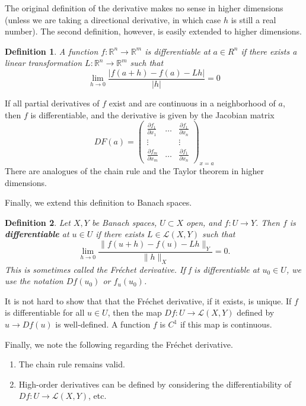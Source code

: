 \documentclass[12pt]{amsart}         %
\newtheorem{definition}{Definition}[section]
\theoremstyle{remark}
\newcommand{\R}{\mathbb{R}}
\begin{document}
The original definition of the derivative makes no sense in higher dimensions (unless we are taking a directional derivative, in which case $h$ is still a real number). The second definition, however, is easily extended to higher dimensions.

\begin{definition}
A function $f:\R^n \rightarrow \R^m$ is \emph{differentiable} at $a \in R^n$ if there exists a linear transformation $L: \R^n \rightarrow \R^m$ such that
\[
\lim_{h \rightarrow 0}\frac{|f(a + h) - f(a) - L h |}{|h|} = 0
\]
\end{definition}

If all partial derivatives of $f$ exist and are continuous in a neighborhood of $a$, then $f$ is differentiable, and the derivative is given by the Jacobian matrix
\[
DF(a) = \begin{pmatrix}
\frac{\partial f_1}{\partial x_1} & \dots & \frac{\partial f_1}{\partial x_n} \\
\vdots && \vdots \\
\frac{\partial f_m}{\partial x_m} & \dots & \frac{\partial f_1}{\partial x_n} 
\end{pmatrix}_{x = a}
\]
There are analogues of the chain rule and the Taylor theorem in higher dimensions. 

Finally, we extend this definition to Banach spaces.

\begin{definition}
Let $X, Y$ be Banach spaces, $U \subset X$ open, and $f \colon U \rightarrow Y$. Then $f$ is \textbf{differentiable} at $u \in U$ if there exists $L \in \mathcal{L}(X, Y)$ such that
\[
\lim_{h \rightarrow 0} \frac{ \|f(u + h) - f(u) - Lh \|_Y}{\|h\|_X} = 0.
\]
This is sometimes called the Fr\'{e}chet derivative. If f is differentiable at $u_0 \in U$, we use the notation $Df(u_0)$ or $f_u(u_0)$.
\end{definition}

It is not hard to show that that the Fr\'{e}chet derivative, if it exists, is unique. If $f$ is differentiable for all $u \in U$, then the map $Df\colon U \rightarrow \mathcal{L}(X,Y)$ defined by $u \rightarrow Df(u)$ is well-defined. A function $f$ is $C^1$ if this map is continuous.

Finally, we note the following regarding the Fr\'{e}chet derivative.

\begin{enumerate}
    \item The chain rule remains valid.
    \item High-order derivatives can be defined by considering the differentiability of $Df: U \rightarrow \mathcal{L}(X,Y)$, etc.
\end{enumerate}
\end{document}
